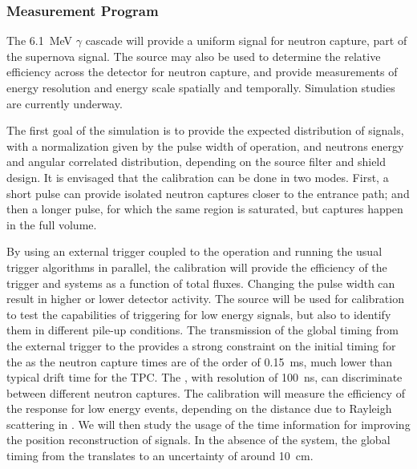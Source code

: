 \subsubsection{Measurement Program}
\label{sec:sp-calib-sys-pns-meas}

The \SI{6.1}{\MeV} $\gamma$ cascade will provide a uniform signal for neutron capture, part of the supernova signal. The source may also be used to determine the relative efficiency across the detector for neutron capture, and provide measurements of energy resolution and energy scale spatially and temporally. Simulation studies are currently underway.


The first goal of the simulation is to provide the expected distribution of signals, with a normalization given by the pulse width of  operation, and neutrons energy and angular correlated distribution, depending on the source filter and shield design.
It is envisaged that the calibration can be done in two modes. First, a short  pulse can provide isolated neutron captures closer to the entrance path; and then a longer 
pulse, for which the same region is saturated, but 
captures 
happen in the full volume.

By using an external trigger coupled to the  operation and running the usual trigger algorithms in parallel, the calibration will provide the efficiency of the trigger and  systems as a function of total fluxes. Changing the pulse width can result in 
higher or lower detector activity. The source will be used for  calibration to test
the capabilities of triggering for low energy signals, but also 
to identify them in different pile-up conditions.
The transmission of the global timing from the external  trigger to the  provides a strong constraint on the initial timing for the 
as the neutron capture times are of the order of \SI{0.15}{\milli\s}, much lower than typical drift time 
for the TPC. The , with resolution of \SI{100}{\nano\s}, can discriminate between different neutron captures. The calibration will measure the efficiency of the  response for low energy events, depending on the distance due to Rayleigh scattering in \lar. We will then study the usage of the  time information for improving the position reconstruction of  signals. In the absence of the  system, the global timing from the  translates to an uncertainty of around \SI{10}{\cm}.


